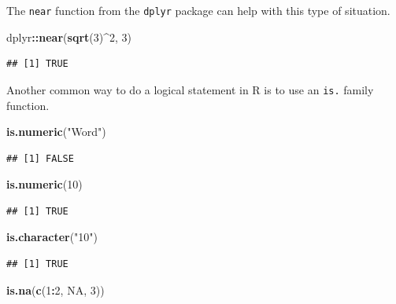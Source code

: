 \documentclass[
]{book}
\newenvironment{Shaded}{\begin{snugshade}}{\end{snugshade}}
\newcommand{\DecValTok}[1]{\textcolor[rgb]{0.00,0.00,0.81}{#1}}
\newcommand{\KeywordTok}[1]{\textcolor[rgb]{0.13,0.29,0.53}{\textbf{#1}}}
\newcommand{\NormalTok}[1]{#1}
\newcommand{\OperatorTok}[1]{\textcolor[rgb]{0.81,0.36,0.00}{\textbf{#1}}}
\newcommand{\OtherTok}[1]{\textcolor[rgb]{0.56,0.35,0.01}{#1}}
\newcommand{\StringTok}[1]{\textcolor[rgb]{0.31,0.60,0.02}{#1}}
\theoremstyle{definition}
\theoremstyle{definition}
\theoremstyle{definition}
\theoremstyle{remark}
\begin{document}
The \texttt{near} function from the \texttt{dplyr} package can help with this type of situation.

\begin{Shaded}
\begin{Highlighting}[]
\NormalTok{dplyr}\OperatorTok{::}\KeywordTok{near}\NormalTok{(}\KeywordTok{sqrt}\NormalTok{(}\DecValTok{3}\NormalTok{)}\OperatorTok{^}\DecValTok{2}\NormalTok{, }\DecValTok{3}\NormalTok{)}
\end{Highlighting}
\end{Shaded}

\begin{verbatim}
## [1] TRUE
\end{verbatim}

Another common way to do a logical statement in R is to use an \texttt{is.} family function.

\begin{Shaded}
\begin{Highlighting}[]
\KeywordTok{is.numeric}\NormalTok{(}\StringTok{"Word"}\NormalTok{)}
\end{Highlighting}
\end{Shaded}

\begin{verbatim}
## [1] FALSE
\end{verbatim}

\begin{Shaded}
\begin{Highlighting}[]
\KeywordTok{is.numeric}\NormalTok{(}\DecValTok{10}\NormalTok{)}
\end{Highlighting}
\end{Shaded}

\begin{verbatim}
## [1] TRUE
\end{verbatim}

\begin{Shaded}
\begin{Highlighting}[]
\KeywordTok{is.character}\NormalTok{(}\StringTok{"10"}\NormalTok{)}
\end{Highlighting}
\end{Shaded}

\begin{verbatim}
## [1] TRUE
\end{verbatim}

\begin{Shaded}
\begin{Highlighting}[]
\KeywordTok{is.na}\NormalTok{(}\KeywordTok{c}\NormalTok{(}\DecValTok{1}\OperatorTok{:}\DecValTok{2}\NormalTok{, }\OtherTok{NA}\NormalTok{, }\DecValTok{3}\NormalTok{))}
\end{Highlighting}
\end{Shaded}
\end{document}

